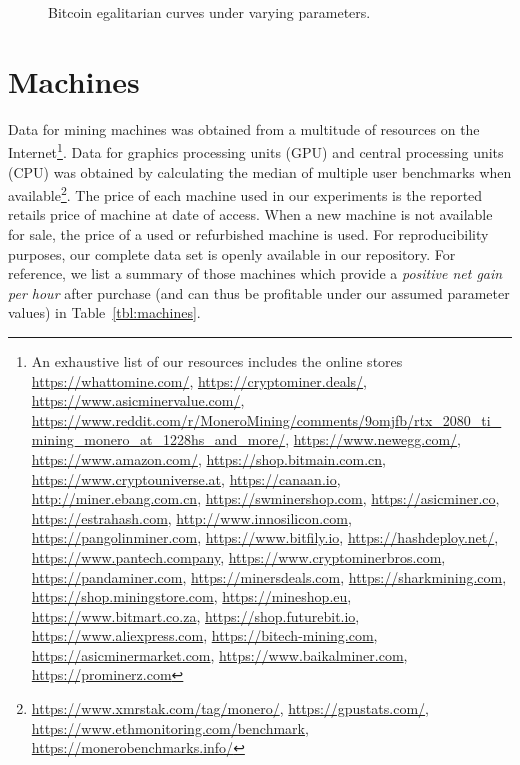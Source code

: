 \begin{figure}
  \caption{Bitcoin egalitarian curves under varying parameters.}
  \label{fig:different-settings}
\end{figure}

\section{Machines}\label{sec:appendix-data}

Data for mining machines was obtained from a multitude of resources on the
Internet\footnote{An exhaustive list of our resources includes the online
stores \url{https://whattomine.com/}, \url{https://cryptominer.deals/},
\url{https://www.asicminervalue.com/},
 \url{https://www.reddit.com/r/MoneroMining/comments/9omjfb/rtx_2080_ti_mining_monero_at_1228hs_and_more/},
\url{https://www.newegg.com/}, \url{https://www.amazon.com/},
\url{https://shop.bitmain.com.cn}, \url{https://www.cryptouniverse.at},
\url{https://canaan.io}, \url{http://miner.ebang.com.cn},
\url{https://swminershop.com}, \url{https://asicminer.co},
\url{https://estrahash.com}, \url{http://www.innosilicon.com},
\url{https://pangolinminer.com}, \url{https://www.bitfily.io},
\url{https://hashdeploy.net/}, \url{https://www.pantech.company},
\url{https://www.cryptominerbros.com}, \url{https://pandaminer.com},
\url{https://minersdeals.com}, \url{https://sharkmining.com},
\url{https://shop.miningstore.com}, \url{https://mineshop.eu},
\url{https://www.bitmart.co.za}, \url{https://shop.futurebit.io},
\url{https://www.aliexpress.com}, \url{https://bitech-mining.com},
\url{https://asicminermarket.com}, \url{https://www.baikalminer.com},
\url{https://prominerz.com}}. Data for graphics processing units (GPU) and
central processing units (CPU) was obtained by calculating the median of
multiple user benchmarks when available\footnote{\url{https://www.xmrstak.com/tag/monero/}, \url{https://gpustats.com/},
\url{https://www.ethmonitoring.com/benchmark},
\url{https://monerobenchmarks.info/}}. The price of each machine used in our experiments is the
reported retails price of machine at date of access. When a new machine is not available
for sale, the price of a used or refurbished machine is used. For reproducibility
purposes, our complete data set is openly available in our repository. For
reference, we list a summary of those machines which provide a
\emph{positive net gain per hour} after purchase (and can thus be profitable
under our assumed parameter values) in Table~\ref{tbl:machines}.

